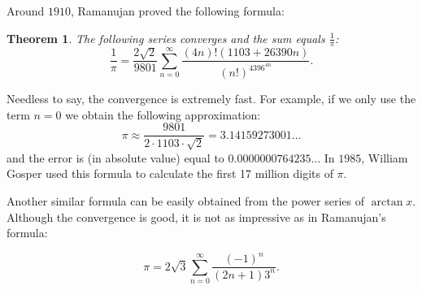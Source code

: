 \documentclass[12pt]{article}
\newtheorem*{thm}{Theorem}
\theoremstyle{definition}
\begin{document}
Around $1910$, Ramanujan proved the following formula:

\begin{thm}
The following series converges and the sum equals $\frac{1}{\pi}$:
$$\frac{1}{\pi}=\frac{2\sqrt{2}}{9801}\sum_{n=0}^\infty \frac{(4n)!(1103+26390n)}{(n!)^4396^{4n}}.$$
\end{thm} 

Needless to say, the convergence is extremely fast. For example, if we only use the term $n=0$ we obtain the following approximation:
$$\pi \approx \frac{9801}{2\cdot 1103\cdot \sqrt{2}}=3.14159273001\ldots$$
and the error is (in absolute value) equal to $0.0000000764235\ldots$ In $1985$, William Gosper used this formula to calculate the first 17 million digits of $\pi$. 

Another similar formula can be easily obtained from the power series of $\arctan x$. Although the convergence is good, it is not as impressive as in Ramanujan's formula:

$$\pi=2\sqrt{3}\sum_{n=0}^\infty \frac{(-1)^n}{(2n+1)3^n}.$$ 
\end{document}
